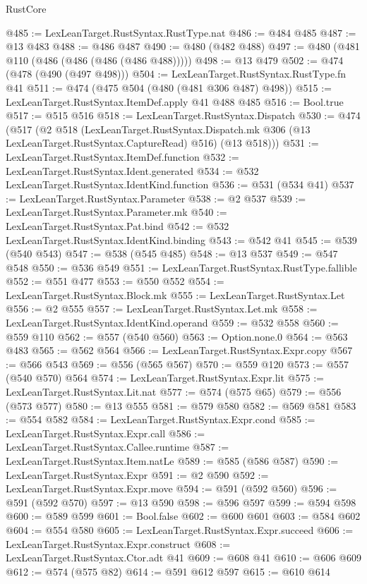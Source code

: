 \begin{lexlean}{RustCore}
\begin{coremodule}
@485 := LexLeanTarget.RustSyntax.RustType.nat
@486 := @484 @485
@487 := @13 @483
@488 := @486 @487
@490 := @480 (@482 @488)
@497 := @480 (@481 @110 (@486 (@486 (@486 (@486 @488)))))
@498 := @13 @479
@502 := @474 (@478 (@490 (@497 @498)))
@504 := LexLeanTarget.RustSyntax.RustType.fn @41
@511 := @474 (@475 @504 (@480 (@481 @306 @487) @498))
@515 := LexLeanTarget.RustSyntax.ItemDef.apply @41 @488 @485
@516 := Bool.true
@517 := @515 @516
@518 := LexLeanTarget.RustSyntax.Dispatch
@530 := @474
    (@517
      (@2
        @518
        (LexLeanTarget.RustSyntax.Dispatch.mk @306 (@13 LexLeanTarget.RustSyntax.CaptureRead) @516)
        (@13 @518)))
@531 := LexLeanTarget.RustSyntax.ItemDef.function
@532 := LexLeanTarget.RustSyntax.Ident.generated
@534 := @532 LexLeanTarget.RustSyntax.IdentKind.function
@536 := @531 (@534 @41)
@537 := LexLeanTarget.RustSyntax.Parameter
@538 := @2 @537
@539 := LexLeanTarget.RustSyntax.Parameter.mk
@540 := LexLeanTarget.RustSyntax.Pat.bind
@542 := @532 LexLeanTarget.RustSyntax.IdentKind.binding
@543 := @542 @41
@545 := @539 (@540 @543)
@547 := @538 (@545 @485)
@548 := @13 @537
@549 := @547 @548
@550 := @536 @549
@551 := LexLeanTarget.RustSyntax.RustType.fallible
@552 := @551 @477
@553 := @550 @552
@554 := LexLeanTarget.RustSyntax.Block.mk
@555 := LexLeanTarget.RustSyntax.Let
@556 := @2 @555
@557 := LexLeanTarget.RustSyntax.Let.mk
@558 := LexLeanTarget.RustSyntax.IdentKind.operand
@559 := @532 @558
@560 := @559 @110
@562 := @557 (@540 @560)
@563 := Option.none.{0}
@564 := @563 @483
@565 := @562 @564
@566 := LexLeanTarget.RustSyntax.Expr.copy
@567 := @566 @543
@569 := @556 (@565 @567)
@570 := @559 @120
@573 := @557 (@540 @570) @564
@574 := LexLeanTarget.RustSyntax.Expr.lit
@575 := LexLeanTarget.RustSyntax.Lit.nat
@577 := @574 (@575 @65)
@579 := @556 (@573 @577)
@580 := @13 @555
@581 := @579 @580
@582 := @569 @581
@583 := @554 @582
@584 := LexLeanTarget.RustSyntax.Expr.cond
@585 := LexLeanTarget.RustSyntax.Expr.call
@586 := LexLeanTarget.RustSyntax.Callee.runtime
@587 := LexLeanTarget.RustSyntax.Item.natLe
@589 := @585 (@586 @587)
@590 := LexLeanTarget.RustSyntax.Expr
@591 := @2 @590
@592 := LexLeanTarget.RustSyntax.Expr.move
@594 := @591 (@592 @560)
@596 := @591 (@592 @570)
@597 := @13 @590
@598 := @596 @597
@599 := @594 @598
@600 := @589 @599
@601 := Bool.false
@602 := @600 @601
@603 := @584 @602
@604 := @554 @580
@605 := LexLeanTarget.RustSyntax.Expr.succeed
@606 := LexLeanTarget.RustSyntax.Expr.construct
@608 := LexLeanTarget.RustSyntax.Ctor.adt @41
@609 := @608 @41
@610 := @606 @609
@612 := @574 (@575 @82)
@614 := @591 @612 @597
@615 := @610 @614

\end{coremodule}
\end{lexlean}
